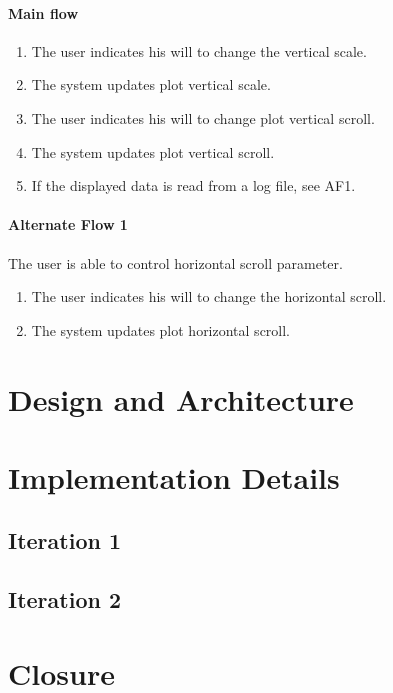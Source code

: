 			\paragraph{Main flow}
				\begin{enumerate}
				\item The user indicates his will to change the vertical scale.
				\item The system updates plot vertical scale.
				\item The user indicates his will to change plot vertical scroll.
				\item The system updates plot vertical scroll.
				\item If the displayed data is read from a log file, see AF1.
				\end{enumerate}
			
			\paragraph{Alternate Flow 1} The user is able to control horizontal scroll parameter.	
				\begin{enumerate}
				\item The user indicates his will to change the horizontal scroll.
				\item The system updates plot horizontal scroll.
				\end{enumerate}

	\section{Design and Architecture}

	\section{Implementation Details}
		\subsection{Iteration 1}
			
		\subsection{Iteration 2}

	\section{Closure}

